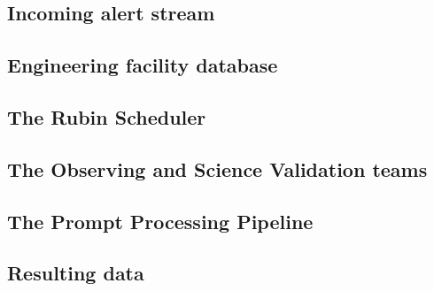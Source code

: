 \subsection{Incoming alert stream}\label{subsec:alertStream Bottleneck}

\subsection{Engineering facility database}\label{subsec:EFD Bottleneck}

\subsection{The Rubin Scheduler}\label{subsec:Scheduler Bottleneck}

\subsection{The Observing and Science Validation teams}\label{subsec:ObsSVTeams Bottleneck}

\subsection{The Prompt Processing Pipeline}\label{subsec:PP Bottleneck}

\subsection{Resulting data}\label{subsec:resultingData Bottleneck}